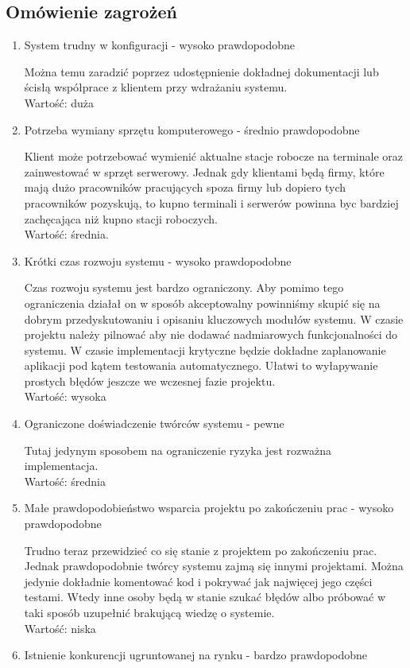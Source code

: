 \documentclass[12pt]{article}
\begin{document}
\subsection{Omówienie zagrożeń}

\begin{enumerate}
	\item System trudny w konfiguracji - wysoko prawdopodobne 
	
		Można temu zaradzić poprzez udostępnienie dokładnej dokumentacji lub ścisłą współprace z klientem przy wdrażaniu systemu. \\
		Wartość: duża
	\item Potrzeba wymiany sprzętu komputerowego - średnio prawdopodobne 
	
		Klient może potrzebować wymienić aktualne stacje robocze na terminale oraz zainwestować w sprzęt serwerowy. Jednak gdy klientami będą firmy, które mają dużo pracowników pracujących spoza firmy lub dopiero tych pracowników pozyskują, to kupno terminali i serwerów powinna byc bardziej zachęcająca niż kupno stacji roboczych.\\
		Wartość: średnia.
	\item Krótki czas rozwoju systemu - wysoko prawdopodobne
	
		Czas rozwoju systemu jest bardzo ograniczony. Aby pomimo tego ograniczenia działał on w sposób akceptowalny powinniśmy skupić się na dobrym przedyskutowaniu i opisaniu kluczowych modułów systemu. W czasie projektu należy pilnować aby nie dodawać nadmiarowych funkcjonalności do systemu. W czasie implementacji krytyczne będzie dokładne zaplanowanie aplikacji pod kątem testowania automatycznego. Ułatwi to wyłapywanie prostych błędów jeszcze we wczesnej fazie projektu.\\
		Wartość: wysoka
	\item Ograniczone doświadczenie twórców systemu - pewne
	
		Tutaj jedynym sposobem na ograniczenie ryzyka jest rozważna implementacja.\\
		Wartość: średnia
	\item Małe prawdopodobieństwo wsparcia projektu po zakończeniu prac - wysoko prawdopodobne
	
		Trudno teraz przewidzieć co się stanie z projektem po zakończeniu prac. Jednak prawdopodobnie twórcy systemu zajmą się innymi projektami. Można jedynie dokładnie komentować kod i pokrywać jak najwięcej jego części testami. Wtedy inne osoby będą w stanie szukać błędów albo próbować w taki sposób uzupełnić brakującą wiedzę o systemie.\\
		Wartość: niska
	\item Istnienie konkurencji ugruntowanej na rynku - bardzo prawdopodobne
	

\end{enumerate}
\end{document}
